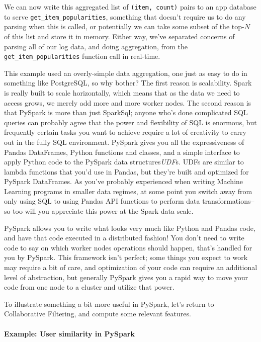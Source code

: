 We can now write this aggregated list of \lstinline{(item, count)} pairs to an app database to serve \lstinline{get_item_popularities}, something that doesn't require us to do any parsing when this is called, or potentially we can take some subset of the top-$N$ of this list and store it in memory. Either way, we've separated concerns of parsing all of our log data, and doing aggregation, from the \lstinline{get_item_popularities} function call in real-time. 

This example used an overly-simple data aggregation, one just as easy to do in something like PostgreSQL, so why bother? The first reason is scalability. Spark is really built to scale horizontally, which means that as the data we need to access grows, we merely add more and more worker nodes. The second reason is that PySpark is more than just SparkSql; anyone who's  done complicated SQL queries can probably agree that the power and flexibility of SQL is enormous, but frequently certain tasks you want to achieve require a lot of creativity to carry out in the fully SQL environment. PySpark gives you all the expressiveness of Pandas DataFrames, Python functions and classes, and a simple interface to apply Python code to the PySpark data structures\textemdash\emph{UDF}s. UDFs are similar to lambda functions that you'd use in Pandas, but they're built and optimized for PySpark DataFrames. As you've probably experienced when writing Machine Learning programs in smaller data regimes, at some point you switch away from only using SQL to using Pandas API functions to perform data transformations–so too will you appreciate this power at the Spark data scale.

PySpark allows you to write what looks very much like Python and Pandas code, and have that code executed in a distributed fashion! You don't need to write code to say on which worker nodes operations should happen, that's handled for you by PySpark. This framework isn't perfect; some things you expect to work may require a bit of care, and optimization of your code can require an additional level of abstraction, but generally PySpark gives you a rapid way to move your code from one node to a cluster and utilize that power.

To illustrate something a bit more useful in PySpark, let's return to Collaborative Filtering, and compute some relevant features.

\paragraph{Example: User similarity in PySpark}

